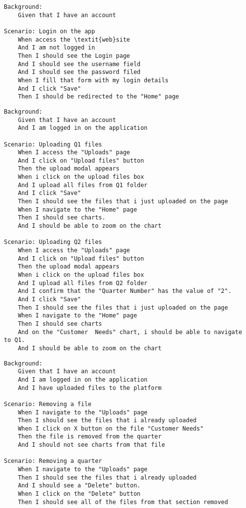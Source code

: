 \begin{lstlisting}[language=Gherkin]
Background:
	Given that I have an account

Scenario: Login on the app
	When access the \textit{web}site
	And I am not logged in
	Then I should see the Login page
	And I should see the username field
	And I should see the password filed
	When I fill that form with my login details
	And I click "Save"
	Then I should be redirected to the "Home" page
\end{lstlisting}
    
\begin{lstlisting}[language=Gherkin]
Background:
	Given that I have an account
	And I am logged in on the application

Scenario: Uploading Q1 files
	When I access the "Uploads" page  
	And I click on "Upload files" button 
	Then the upload modal appears 
	When i click on the upload files box
	And I upload all files from Q1 folder
	And I click "Save"
	Then I should see the files that i just uploaded on the page
	When I navigate to the "Home" page
	Then I should see charts. 
	And I should be able to zoom on the chart
	
Scenario: Uploading Q2 files
	When I access the "Uploads" page  
	And I click on "Upload files" button 
	Then the upload modal appears 
	When i click on the upload files box
	And I upload all files from Q2 folder
	And I confirm that the "Quarter Number" has the value of "2".
	And I click "Save"
	Then I should see the files that i just uploaded on the page
	When I navigate to the "Home" page
	Then I should see charts
	And on the "Customer  Needs" chart, i should be able to navigate to Q1.
	And I should be able to zoom on the chart
\end{lstlisting}

\begin{lstlisting}[language=Gherkin]
    Background:  
	Given that I have an account
	And I am logged in on the application
	And I have uploaded files to the platform
 
Scenario: Removing a file
	When I navigate to the "Uploads" page  
	Then I should see the files that i already uploaded
	When I click on X button on the file "Customer Needs"
	Then the file is removed from the quarter
	And I should not see charts from that file
	
Scenario: Removing a quarter
	When I navigate to the "Uploads" page  
	Then I should see the files that i already uploaded
	And I should see a "Delete" button.
	When I click on the "Delete" button
	Then I should see all of the files from that section removed 
\end{lstlisting}

